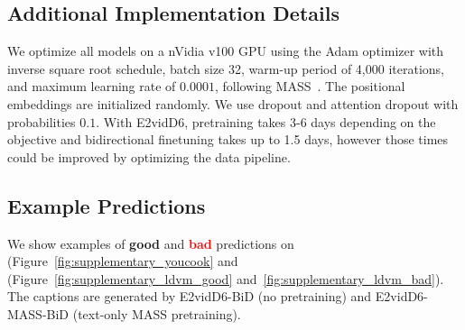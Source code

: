 \documentclass[11pt,a4paper]{article}
\begin{document}
\subsection{Additional Implementation Details~\label{app:implementation}}

We optimize all models on a nVidia v100 GPU using the Adam optimizer with inverse square root schedule, batch size 32, warm-up period of 4,000 iterations, and maximum learning rate of $0.0001$, following MASS~\citep{song2019mass}. The positional embeddings are initialized randomly. We use dropout and attention dropout with probabilities $0.1$.
 With E2vidD6, pretraining takes 3-6 days depending on the objective and bidirectional finetuning takes up to 1.5 days, however those times could be improved by optimizing the data pipeline.

\subsection{Example Predictions}

We show examples of \textcolor{green!70!black}{\textbf{good}} and \textcolor{red}{\textbf{bad}} predictions on \youcook (Figure~\ref{fig:supplementary_youcook} and \ldvmmerged (Figure~\ref{fig:supplementary_ldvm_good} and~\ref{fig:supplementary_ldvm_bad}).
The captions are generated by E2vidD6-BiD (no pretraining) and E2vidD6-MASS-BiD (text-only MASS pretraining).
\end{document}
